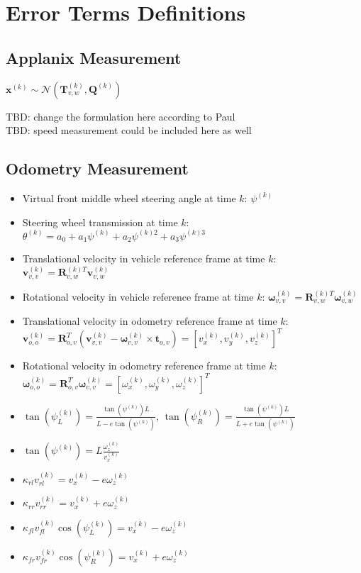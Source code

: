 \documentclass[12pt]{article}
\begin{document}
  \section{Error Terms Definitions}\label{sec:errors}
    \subsection{Applanix Measurement}
      $\mathbf{x}^{(k)}\sim\mathcal{N}(\mathbf{T}_{v,w}^{(k)},
        \mathbf{Q}^{(k)})$

      \noindent TBD: change the formulation here according to Paul\\
      \noindent TBD: speed measurement could be included here as well

    \subsection{Odometry Measurement}
      \begin{itemize}
        \item Virtual front middle wheel steering angle at time $k$:
          $\psi^{(k)}$
        \item Steering wheel transmission at time $k$:
          $\theta^{(k)} = a_0 + a_1\psi^{(k)} + a_2\psi^{(k)2} + a_3\psi^{(k)3}$
        \item Translational velocity in vehicle reference frame at time $k$:
          $\mathbf{v}_{v,v}^{(k)}=\mathbf{R}_{v,w}^{(k)T}\mathbf{v}_{v,w}^{(k)}$
        \item Rotational velocity in vehicle reference frame at time $k$:
          $\boldsymbol{\omega}_{v,v}^{(k)}=\mathbf{R}_{v,w}^{(k)T}
          \boldsymbol{\omega}_{v,w}^{(k)}$
        \item Translational velocity in odometry reference frame at time $k$:
          $\mathbf{v}_{o,o}^{(k)}=\mathbf{R}_{o,v}^T(\mathbf{v}_{v,v}^{(k)} -
          \boldsymbol{\omega}_{v,v}^{(k)}\times\mathbf{t}_{o,v})=
          [v_x^{(k)},v_y^{(k)},v_z^{(k)}]^T$
        \item Rotational velocity in odometry reference frame at time $k$:
          $\boldsymbol{\omega}_{o,o}^{(k)}=\mathbf{R}_{o,v}^T
          \boldsymbol{\omega}_{v,v}^{(k)}=
          [\omega_x^{(k)},\omega_y^{(k)},\omega_z^{(k)}]^T$
         \item $\tan(\psi_L^{(k)})=
           \frac{\tan(\psi^{(k)}) L}{L - e\tan(\psi^{(k)})}$,
           $\tan(\psi_R^{(k)})=\frac{\tan(\psi^{(k)}) L}{L + e\tan(\psi^{(k)})}$
         \item $\tan(\psi^{(k)})=L\frac{\omega_z^{(k)}}{v_x^{(k)}}$
         \item $\kappa_{rl}v_{rl}^{(k)}=v_x^{(k)}-e\omega_z^{(k)}$
         \item $\kappa_{rr}v_{rr}^{(k)}=v_x^{(k)}+e\omega_z^{(k)}$
         \item $\kappa_{fl}v_{fl}^{(k)}\cos(\psi_L^{(k)})=
           v_x^{(k)}-e\omega_z^{(k)}$
         \item $\kappa_{fr}v_{fr}^{(k)}\cos(\psi_R^{(k)})=
           v_x^{(k)}+e\omega_z^{(k)}$
      \end{itemize}
\end{document}
